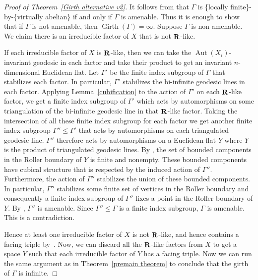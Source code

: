 \documentclass{amsart}
\theoremstyle{definition}
\newtheorem*{Notation warning}{Warning on notations}
\newtheorem*{Sketch of proof}{Sketch of proof for Theorem C}
\DeclareMathOperator{\Gir}{Girth}
\DeclareMathOperator{\R}{\bf{R}}
\def\aut{\mathop{\mathrm{Aut}}\nolimits}
\begin{document}
\begin{sloppypar}
\begin{proof}[Proof of Theorem~\ref{Girth alternative v2}]
    It follows from \cite[Theorem~1.7]{CL10} that $\Gamma$ is \{locally finite\}-by-\{virtually abelian\} if and only if $\Gamma$ is amenable.
    Thus it is enough to show that if $\Gamma$ is not amenable, then $\Gir(\Gamma)=\infty$.
    Suppose $\Gamma$ is non-amenable.
    We claim there is an irreducible factor of $X$ that is not $\R$-like.


  If each irreducible factor of $X$ is $\R$-like, then we can take the $\aut(X_i)$-invariant geodesic in each factor and take their product to get an invariant $n$-dimensional Euclidean flat.
  Let $\Gamma'$ be the finite index subgroup of $\Gamma$ that stabilizes each factor.
  In particular, $\Gamma'$ stabilizes the bi-infinite geodesic lines in each factor.
  Applying Lemma~\ref{cubification} to the action of $\Gamma'$ on each $\R$-like factor, we get a finite index subgroup of $\Gamma'$ which acts by automorphisms on some triangulation of the bi-infinite geodesic line in that $\R$-like factor. Taking the intersection of all these finite index subgroup for each factor we get another finite index subgroup $\Gamma''\le\Gamma'$ that acts by automorphisms on each triangulated geodesic line. $\Gamma''$ therefore acts by automorphisms on a Euclidean flat $Y$ where $Y$ is the product of triangulated geodesic lines.
 By \cite[Lemma 2.8]{Genevois}, the set of bounded components in the Roller boundary of $Y$ is finite and nonempty.
 These bounded components have cubical structure that is respected by the induced action of $\Gamma''$.
  Furthermore, the action of $\Gamma''$ stabilizes the union of these bounded components.
  In particular, $\Gamma''$ stabilizes some finite set of vertices in the Roller boundary and consequently a finite index subgroup of $\Gamma''$ fixes a point in the Roller boundary of $Y$.
  By \cite[Theorem A.5]{CL}, $\Gamma''$ is amenable.
  Since $\Gamma''\le\Gamma$ is a finite index subgroup, $\Gamma$ is amenable.
  This is a contradiction. 
  
    Hence at least one irreducible factor of $X$ is not $\R$-like, and hence contains a facing triple by~\cite[Theorem 7.2]{Caprace_2011}.
    Now, we can discard all the $\R$-like factors from $X$ to get a space $Y$  such that each irreducible factor of $Y$ has a facing triple.
    Now we can run the same argument as in Theorem~\ref{premain theorem} to conclude that the girth of $\Gamma$ is infinite.
\end{proof}



\end{sloppypar}
\end{document}
